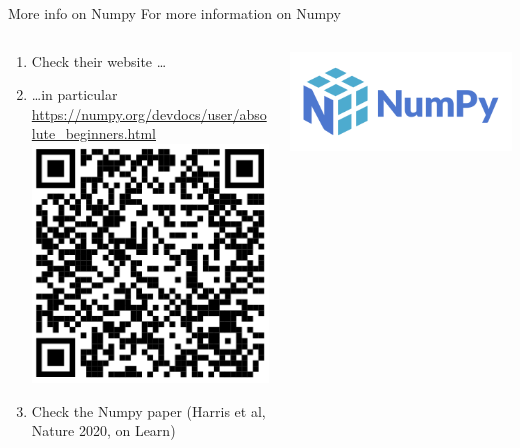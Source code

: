 \documentclass[9pt, aspectratio=169]{beamer}
\begin{document}
\begin{frame}
    {More info on Numpy}
    For more information on Numpy

    \begin{columns}
        \begin{column}{.7\textwidth}
            \begin{enumerate}
                \item Check their website \dots
                \item \dots in particular \url{https://numpy.org/devdocs/user/absolute_beginners.html} \includegraphics[width=.25\textwidth]{QRnumpy.png}
                \item Check the Numpy paper (Harris et al, Nature 2020, on Learn)
            \end{enumerate}
        \end{column}
        \begin{column}{.3\textwidth}
            \includegraphics[width=\textwidth, trim=0  0  390  0, clip]{numpylogo.png}
        \end{column}
    \end{columns}
\end{frame}
\end{document}
